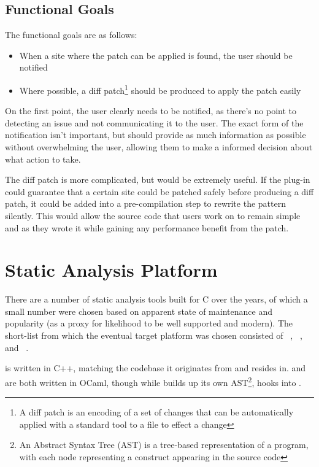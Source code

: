 \subsection{Functional Goals}

The functional goals are as follows:

\begin{itemize}
	\item When a site where the patch can be applied is found, the user should be notified
	\item Where possible, a diff patch\footnote{A diff patch is an encoding of a set of changes that can be automatically applied with a standard tool to a file to effect a change} should be produced to apply the patch easily
\end{itemize}

On the first point, the user clearly needs to be notified, as there's no point to detecting an issue and not communicating it to the user. The exact form of the notification isn't important, but should provide as much information as possible without overwhelming the user, allowing them to make a informed decision about what action to take.

The diff patch is more complicated, but would be extremely useful. If the plug-in could guarantee that a certain site could be patched safely before producing a diff patch, it could be added into a pre-compilation step to rewrite the pattern silently. This would allow the source code that users work on to remain simple and as they wrote it while gaining any performance benefit from the patch.

\section{Static Analysis Platform}

There are a number of static analysis tools built for C over the years, of which a small number were chosen based on apparent state of maintenance and popularity (as a proxy for likelihood to be well supported and modern). The short-list from which the eventual target platform was chosen consisted of ~\cite{clang-analyzer}, ~\cite{frama}, and ~\cite{fbinfer}.

 is written in C++, matching the  codebase it originates from and resides in.  and  are both written in OCaml, though while  builds up its own AST\footnote{An Abstract Syntax Tree (AST) is a tree-based representation of a program, with each node representing a construct appearing in the source code},  hooks into .

